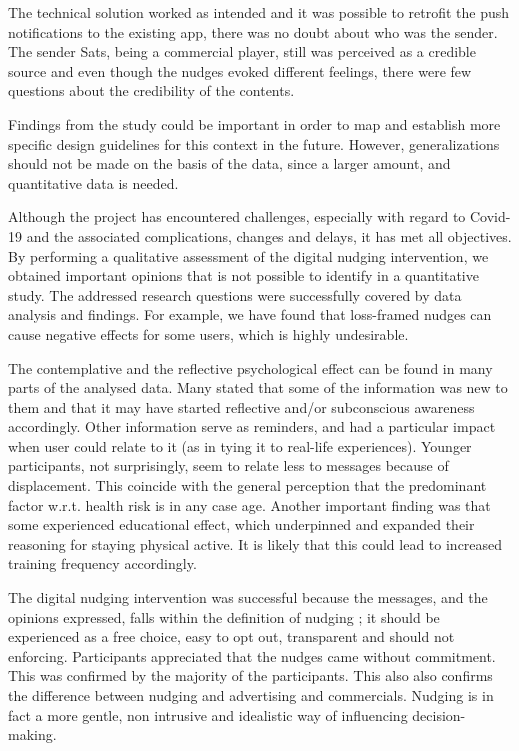 The technical solution worked as intended and it was possible to retrofit the push notifications to the existing app, there was no doubt about who was the sender. The sender Sats, being a commercial player, still was perceived as a credible source and even though the nudges evoked different feelings, there were few questions about the credibility of the contents.

Findings from the study could be important in order to map and establish more specific design guidelines for this context in the future. However, generalizations should not be made on the basis of the data, since a larger amount, and quantitative data is needed.

Although the project has encountered challenges, especially with regard to Covid-19 and the associated complications, changes and delays, it has met all objectives. By performing a qualitative assessment of the digital nudging intervention, we obtained important opinions that is not possible to identify in a quantitative study. The addressed research questions were successfully covered by data analysis and findings. For example, we have found that loss-framed nudges can cause negative effects for some users, which is highly undesirable. 

The contemplative and the reflective psychological effect can be found in many parts of the analysed data. Many stated that some of the information was new to them and that it may have started reflective and/or subconscious awareness accordingly. Other information serve as reminders, and had a particular impact when user could relate to it (as in tying it to real-life experiences). Younger participants, not surprisingly, seem to relate less to messages because of displacement. This coincide with the general perception that the predominant factor w.r.t. health risk is in any case age. Another important finding was that some experienced educational effect, which underpinned and expanded their reasoning for staying physical active. It is likely that this could lead to increased training frequency accordingly. 


The digital nudging intervention was successful because the messages, and the opinions expressed, falls within the definition of nudging ; it should be experienced as a free choice, easy to opt out, transparent and should not enforcing. Participants appreciated that the nudges came without commitment. This was confirmed by the majority of the participants. This also also confirms the difference between nudging and advertising and commercials. Nudging is in fact a more gentle, non intrusive and idealistic way of influencing decision-making. 

